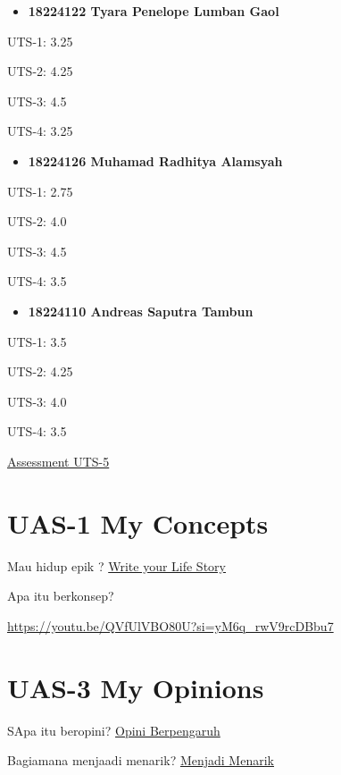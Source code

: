 \documentclass[
  letterpaper,
  DIV=11,
  numbers=noendperiod]{scrreprt}
\providecommand{\tightlist}{%
  \setlength{\itemsep}{0pt}\setlength{\parskip}{0pt}}
\begin{document}
\begin{itemize}
\tightlist
\item
  \textbf{18224122 Tyara Penelope Lumban Gaol}
\end{itemize}

UTS-1: 3.25

UTS-2: 4.25

UTS-3: 4.5

UTS-4: 3.25

\begin{itemize}
\tightlist
\item
  \textbf{18224126 Muhamad Radhitya Alamsyah}
\end{itemize}

UTS-1: 2.75

UTS-2: 4.0

UTS-3: 4.5

UTS-4: 3.5

\begin{itemize}
\tightlist
\item
  \textbf{18224110 Andreas Saputra Tambun}
\end{itemize}

UTS-1: 3.5

UTS-2: 4.25

UTS-3: 4.0

UTS-4: 3.5

\href{UTS-5_Skor.xlsx}{Assessment UTS-5}


\chapter{UAS-1 My Concepts}\label{uas-1-my-concepts}

Mau hidup epik ? \href{lifestory.pdf}{Write your Life Story}

Apa itu berkonsep?

\url{https://youtu.be/QVfUlVBO80U?si=yM6q_rwV9rcDBbu7}


\chapter{UAS-3 My Opinions}\label{uas-3-my-opinions}

SApa itu beropini? \href{BM\%20Opini.mp4}{Opini Berpengaruh}

Bagiamana menjaadi menarik? \href{./Interesting.mp4}{Menjadi Menarik}

\end{document}
